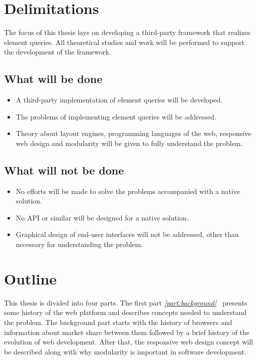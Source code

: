 \documentclass[a4paper,11pt]{kth-mag}
\begin{document}
    \section{Delimitations}
      The focus of this thesis lays on developing a \gls{third-party} framework that realizes element queries.
      All theoretical studies and work will be performed to support the development of the framework.

      \subsection{What will be done}
      \begin{itemize}
      \item A \gls{third-party} implementation of element queries will be developed.
      \item The problems of implementing element queries  will be addressed.
      \item Theory about \glspl{layout engine}, programming languages of the web, \gls{responsive} \gls{web} design and modularity will be given to fully understand the problem.
      \end{itemize}

      \subsection{What will not be done}
      \begin{itemize}
      \item No efforts will be made to solve the problems accompanied with a \gls{native} solution.
      \item No \gls{API} or similar will be designed for a \gls{native} solution.
      \item Graphical design of end-user interfaces will not be addressed, other than necessary for understanding the problem.
      \end{itemize}
    \section{Outline}
      This thesis is divided into four parts. The first part \emph{\ref{part:background}~} presents some history of the \gls{web} platform and describes concepts needed to understand the problem.
      The background part starts with the history of \glspl{browser} and information about market share between them followed by a brief history of the evolution of \gls{web} development.
      After that, the \gls{responsive} \gls{web} design concept will be described along with why modularity is important in software development.
\end{document}

